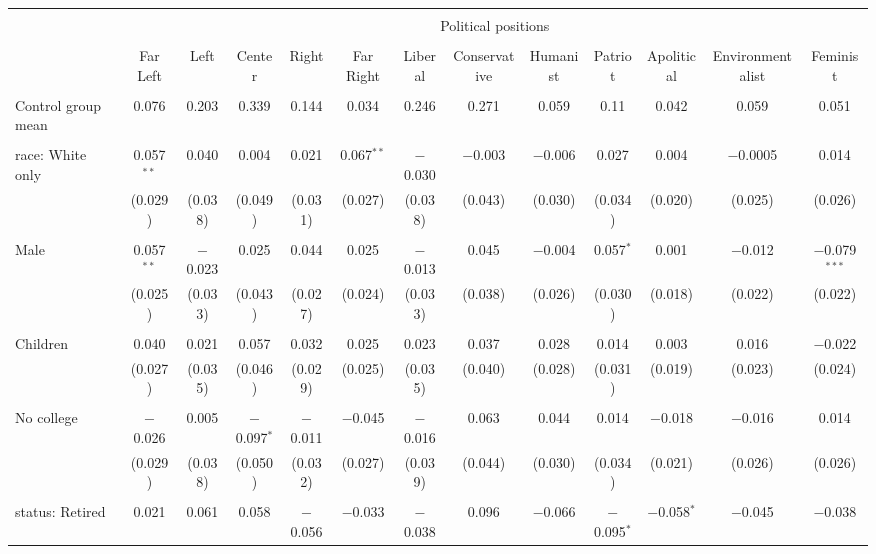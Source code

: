 
\begin{tabular}{@{\extracolsep{5pt}}lcccccccccccc} 
\\[-1.8ex]\hline 
\hline \\[-1.8ex] 
 & \multicolumn{12}{c}{Political positions} \\ 
\cline{2-13} 
\\[-1.8ex] & Far Left & Left & Center & Right & Far Right & Liberal & Conservative & Humanist & Patriot & Apolitical & Environmentalist & Feminist \\ 
\hline \\[-1.8ex] 
 Control group mean & 0.076 & 0.203 & 0.339 & 0.144 & 0.034 & 0.246 & 0.271 & 0.059 & 0.11 & 0.042 & 0.059 & 0.051  \\ \hline \\[-1.8ex] race: White only & 0.057$^{**}$ & 0.040 & 0.004 & 0.021 & 0.067$^{**}$ & $-$0.030 & $-$0.003 & $-$0.006 & 0.027 & 0.004 & $-$0.0005 & 0.014 \\ 
  & (0.029) & (0.038) & (0.049) & (0.031) & (0.027) & (0.038) & (0.043) & (0.030) & (0.034) & (0.020) & (0.025) & (0.026) \\ 
  & & & & & & & & & & & & \\ 
 Male & 0.057$^{**}$ & $-$0.023 & 0.025 & 0.044 & 0.025 & $-$0.013 & 0.045 & $-$0.004 & 0.057$^{*}$ & 0.001 & $-$0.012 & $-$0.079$^{***}$ \\ 
  & (0.025) & (0.033) & (0.043) & (0.027) & (0.024) & (0.033) & (0.038) & (0.026) & (0.030) & (0.018) & (0.022) & (0.022) \\ 
  & & & & & & & & & & & & \\ 
 Children & 0.040 & 0.021 & 0.057 & 0.032 & 0.025 & 0.023 & 0.037 & 0.028 & 0.014 & 0.003 & 0.016 & $-$0.022 \\ 
  & (0.027) & (0.035) & (0.046) & (0.029) & (0.025) & (0.035) & (0.040) & (0.028) & (0.031) & (0.019) & (0.023) & (0.024) \\ 
  & & & & & & & & & & & & \\ 
 No college & $-$0.026 & 0.005 & $-$0.097$^{*}$ & $-$0.011 & $-$0.045 & $-$0.016 & 0.063 & 0.044 & 0.014 & $-$0.018 & $-$0.016 & 0.014 \\ 
  & (0.029) & (0.038) & (0.050) & (0.032) & (0.027) & (0.039) & (0.044) & (0.030) & (0.034) & (0.021) & (0.026) & (0.026) \\ 
  & & & & & & & & & & & & \\ 
 status: Retired & 0.021 & 0.061 & 0.058 & $-$0.056 & $-$0.033 & $-$0.038 & 0.096 & $-$0.066 & $-$0.095$^{*}$ & $-$0.058$^{*}$ & $-$0.045 & $-$0.038 \\ 

\end{tabular}
